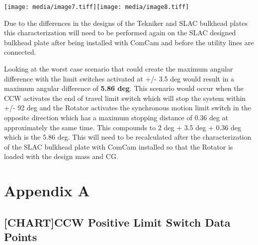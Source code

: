 \documentclass[SE,lsstdraft,authoryear,toc]{lsstdoc}
\begin{document}
\texttt{[image: media/image7.tiff]}\texttt{[image: media/image8.tiff]}

Due to the differences in the designs of the Tekniker and SLAC bulkhead
plates this characterization will need to be performed again on the SLAC
designed bulkhead plate after being installed with ComCam and before the
utility lines are connected.

Looking at the worst case scenario that could create the maximum angular
difference with the limit switches activated at +/- 3.5 deg would result
in a maximum angular difference of \textbf{5.86 deg}. This scenario
would occur when the CCW activates the end of travel limit switch which
will stop the system within +/- 92 deg and the Rotator activates the
synchronous motion limit switch in the opposite direction which has a
maximum stopping distance of 0.36 deg at approximately the same time.
This compounds to 2 deg + 3.5 deg + 0.36 deg which is the 5.86 deg. This
will need to be recalculated after the characterization of the SLAC
bulkhead plate with ComCam installed so that the Rotator is loaded with
the design mass and CG.

\hypertarget{appendix-a}{%
\section{Appendix A}\label{appendix-a}}

\hypertarget{chartccw-positive-limit-switch-data-points}{%
\subsection{\texorpdfstring{{{[}CHART{]}}CCW Positive Limit Switch Data
Points}{{[}CHART{]}CCW Positive Limit Switch Data Points}}\label{chartccw-positive-limit-switch-data-points}}
\end{document}
